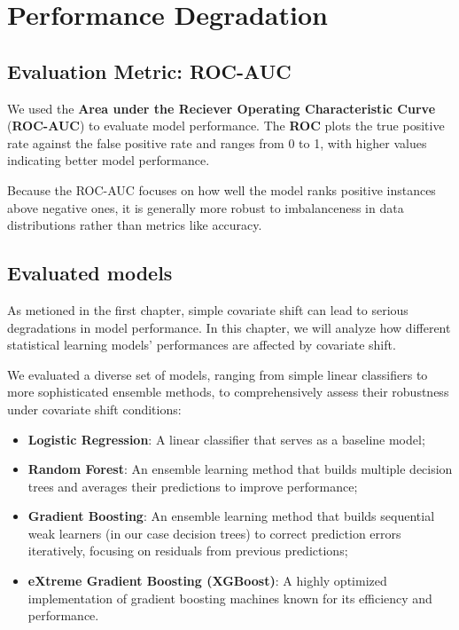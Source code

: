 \chapter{Performance Degradation}

\vspace{-0.3em}

\section{Evaluation Metric: ROC-AUC}

We used the \textbf{Area under the Reciever Operating Characteristic Curve} (\textbf{ROC-AUC}) to evaluate model performance. The \textbf{ROC} plots the true positive rate against the false positive rate and ranges from 0 to 1, with higher values indicating better model performance.

Because the ROC-AUC focuses on how well the model ranks positive instances above negative ones, it is generally more robust to imbalanceness in data distributions rather than metrics like accuracy.

\vspace{-0.3em}

\section{Evaluated models}

As metioned in the first chapter, simple covariate shift can lead to serious degradations in model performance. In this chapter, we will analyze how different statistical learning models' performances are affected by covariate shift. 

We evaluated a diverse set of models, ranging from simple linear classifiers to more sophisticated ensemble methods, to comprehensively assess their robustness under covariate shift conditions:

\begin{itemize}
    \item \textbf{Logistic Regression}: A linear classifier that serves as a baseline model;
    \item \textbf{Random Forest}: An ensemble learning method that builds multiple decision trees and averages their predictions to improve performance;
    \item \textbf{Gradient Boosting}: An ensemble learning method that builds sequential weak learners (in our case decision trees) to correct prediction errors iteratively, focusing on residuals from previous predictions;
    \item \textbf{eXtreme Gradient Boosting (XGBoost)}: A highly optimized implementation of gradient boosting machines known for its efficiency and performance.
\end{itemize}

